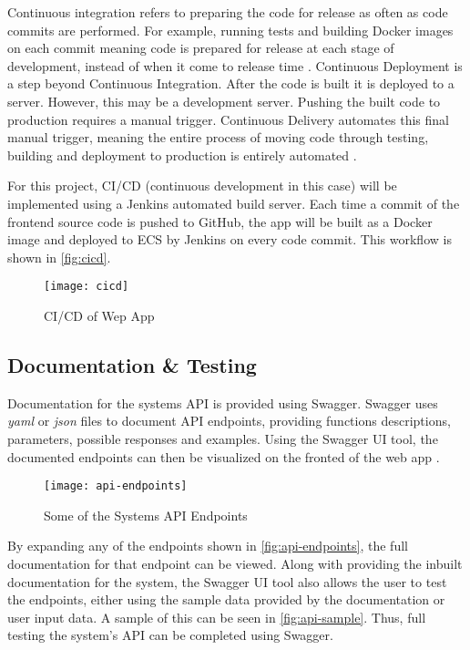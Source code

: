 	Continuous integration refers to preparing the code for release as often as code commits are performed. For example, running tests and building Docker images on each commit meaning code is prepared for release at each stage of development, instead of when it come to release time \citep{ramos}.
	Continuous Deployment is a step beyond Continuous Integration. After the code is built it is deployed to a server. However, this may be a development server. Pushing the built code to production requires a manual trigger. Continuous Delivery automates this final manual trigger, meaning the entire process of moving code through testing, building and deployment to production is entirely automated \citep{ellingwood}.
	
	For this project, CI/CD (continuous development in this case) will be implemented using a Jenkins automated build server. Each time a commit of the frontend source code is pushed to GitHub, the app will be built as a Docker image and deployed to ECS by Jenkins on every code commit. This workflow is shown in \autoref{fig:cicd}.
	
	\begin{figure}[H]
		\setlength{\belowcaptionskip}{15pt plus 3pt minus 2pt}
		\caption{CI/CD of Wep App}
		\centering
		\texttt{[image: cicd]}
		\label{fig:cicd}
	\end{figure}

	\subsection{Documentation \& Testing}
  Documentation for the systems API is provided using Swagger. Swagger uses \textit{yaml} or \textit{json} files to document API endpoints, providing functions descriptions, parameters, possible responses and examples. Using the Swagger UI tool, the documented endpoints can then be visualized on the fronted of the web app \citep{swagger}.
  
  \begin{figure}[H]
    \setlength{\belowcaptionskip}{15pt plus 3pt minus 2pt}
    \caption{Some of the Systems API Endpoints}
    \centering
    \texttt{[image: api-endpoints]}
    \label{fig:api-endpoints}
  \end{figure}
  
  
  By expanding any of the endpoints shown in \autoref{fig:api-endpoints}, the full documentation for that endpoint can be viewed. Along with providing the inbuilt documentation for the system, the Swagger UI tool also allows the user to test the endpoints, either using the sample data provided by the documentation or user input data. A sample of this can be seen in \autoref{fig:api-sample}. Thus, full testing the system's API can be completed using Swagger.
  
